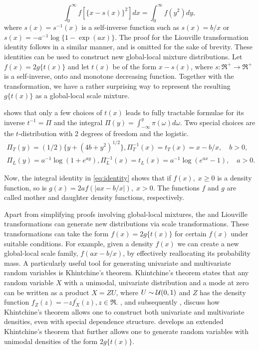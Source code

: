\documentclass[lineno]{biometrika}
\begin{document}
\begin{equation}
  \int_0^\infty f\left[ \{x-s(x)\}^2 \right] dx =  \int_0^\infty f( y^2 ) dy, \label{eq:gen}
\end{equation}
where $s(x)=s^{-1}(x)$ is a self-inverse function such as $s(x) = b/x$ or $s(x) = -a^{-1}\log\{1-\exp(a x)\}$. The proof for the Liouville transformation identity follows in a
similar manner, and is omitted for the sake of brevity. These identities can be used to construct new global-local mixture distributions. 
Let $f(x) = 2g\{ t(x) \}$ and let $t(x)$ be of the form $x-s(x)$, where $s : \Re^+ \to \Re^+$ is a self-inverse, onto and monotone decreasing function. Together with the \CS{} transformation, we have a rather surprising way to represent the resulting $g\{t(x)\}$ as a global-local scale mixture. 

\citet{jones_generating_2014} shows that only a few choices of $t(x)$ leads to fully tractable formulae for its inverse $t^{-1}= \Pi$ and the integral 
$\Pi(y) = \int_{-\infty}^{y} \pi(\omega) d\omega$. Two special choices are the $t$-distribution with 2 degrees of freedom and the logistic. 
\begin{align*}
\Pi_{T}(y) = (1/2)\{ y+(4b+y^2)^{1/2}\}, \Pi_T^{-1}(x) = t_T(x) = x - b/x, \quad b >0,\\
\Pi_{L}(y) = a^{-1} \log(1+e^{ay}), \Pi_L^{-1}(x) = t_L(x) = a^{-1} \log(e^{ax}-1), \quad a>0.
\end{align*}

Now, the integral identity in \eqref{eq:identity} shows that if $f(x), \;x\geq 0$ is a density function, so is $g(x) = 2a f(|ax-b/x|), \; x > 0$.  The functions $f$ and $g$ are called mother and daughter density functions, respectively.  %

Apart from simplifying proofs involving global-local mixtures, the \CS{} and Liouville transformations can generate new distributions via scale transformations. These transformations can take the form $f(x) = 2 g\{ t(x) \}$ for certain $f(x)$ under suitable conditions. For example, given a density $f(x)$ we can create a new global-local
scale family, $f(a x - b/x)$, by effectively reallocating its probability mass. A particularly useful tool for generating univariate and multivariate random
variables is Khintchine's theorem.  
Khintchine's theorem states that any random variable $X$ with a unimodal, univariate distribution and a mode at zero can be written as a product 
$X = Z U$, where $U \sim \mathcal{U}(0,1)$ and $Z$ has the density function $f_Z(z) = -z f^{\prime}_{X}(z), z \in \Re$. \citet{bryson1982constructing}, and subsequently \citet{jones2012khintchine}, discuss how Khintchine's theorem allows one to construct both univariate and multivariate densities, even with special dependence structure. \cite{jones_generating_2014} develops an extended Khintchine's theorem that further allows one to generate random variables with unimodal densities of the
form $2 g\{t(x)\}$. 
\end{document}
